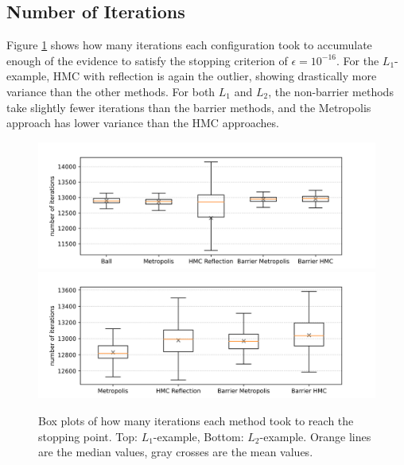 \documentclass[12pt, a4paper]{report}
\begin{document}
\subsection{Number of Iterations}
Figure \ref{fig:results_iterations} shows how many iterations each configuration took to accumulate enough of the evidence to satisfy the stopping criterion of $\epsilon = 10^{-16}$.
For the $L_1$-example, HMC with reflection is again the outlier, showing drastically more variance than the other methods.
For both $L_1$ and $L_2$, the non-barrier methods take slightly fewer iterations than the barrier methods, and the Metropolis approach has lower variance than the HMC approaches.
\begin{figure}
    \centering
    \includegraphics[scale=0.4]{figs/results/iterations_spike_20d.png}
    \includegraphics[scale=0.4]{figs/results/iterations_spike_offcenter_20d.png}
    \caption{Box plots of how many iterations each method took to reach the stopping point. Top: $L_1$-example, Bottom: $L_2$-example. Orange lines are the median values, gray crosses are the mean values.}
    \label{fig:results_iterations}
\end{figure}
\end{document}
